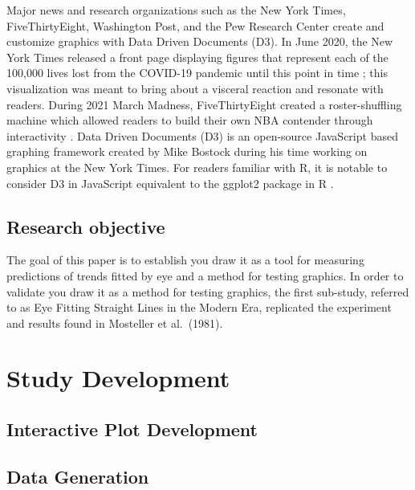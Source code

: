 \documentclass[12pt]{article}
\begin{document}
Major news and research organizations such as the New York Times,
FiveThirtyEight, Washington Post, and the Pew Research Center create and
customize graphics with Data Driven Documents (D3). In June 2020, the
New York Times released a front page displaying figures that represent
each of the 100,000 lives lost from the COVID-19 pandemic until this
point in time \citep{NYTrememberinglives}; this visualization was meant
to bring about a visceral reaction and resonate with readers. During
2021 March Madness, FiveThirtyEight created a roster-shuffling machine
which allowed readers to build their own NBA contender through
interactivity \citep{ryanabest_2021}. Data Driven Documents (D3) is an
open-source JavaScript based graphing framework created by Mike Bostock
during his time working on graphics at the New York Times. For readers
familiar with R, it is notable to consider D3 in JavaScript equivalent
to the ggplot2 package in R \citep{ggplot2}.

\hypertarget{research-objective}{%
\subsection{Research objective}\label{research-objective}}

The goal of this paper is to establish you draw it as a tool for
measuring predictions of trends fitted by eye and a method for testing
graphics. In order to validate you draw it as a method for testing
graphics, the first sub-study, referred to as Eye Fitting Straight Lines
in the Modern Era, replicated the experiment and results found in
Mosteller et al.~(1981).

\hypertarget{study-development}{%
\section{Study Development}\label{study-development}}

\hypertarget{interactive-plot-development}{%
\subsection{Interactive Plot
Development}\label{interactive-plot-development}}

\hypertarget{data-generation}{%
\subsection{Data Generation}\label{data-generation}}
\end{document}

